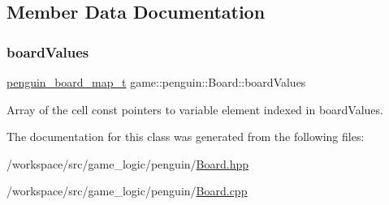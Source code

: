 \subsection{Member Data Documentation}
\mbox{\label{classgame_1_1penguin_1_1_board_ab89d4ad0fcac9a4cb2ebebb3d0aa3eed}} 
\subsubsection{\texorpdfstring{board\+Values}{boardValues}}
{\footnotesize\ttfamily \hyperlink{namespacegame_1_1penguin_a6ea7c0fc4c04931bf39fcac439c92735}{penguin\+\_\+board\+\_\+map\+\_\+t} game\+::penguin\+::\+Board\+::board\+Values\hspace{0.3cm}{\ttfamily [protected]}}



Array of the cell const pointers to variable element indexed in board\+Values. 



The documentation for this class was generated from the following files\+:\begin{DoxyCompactItemize}
\item 
/workspace/src/game\+\_\+logic/penguin/\hyperlink{penguin_2_board_8hpp}{Board.\+hpp}\item 
/workspace/src/game\+\_\+logic/penguin/\hyperlink{penguin_2_board_8cpp}{Board.\+cpp}\end{DoxyCompactItemize}
